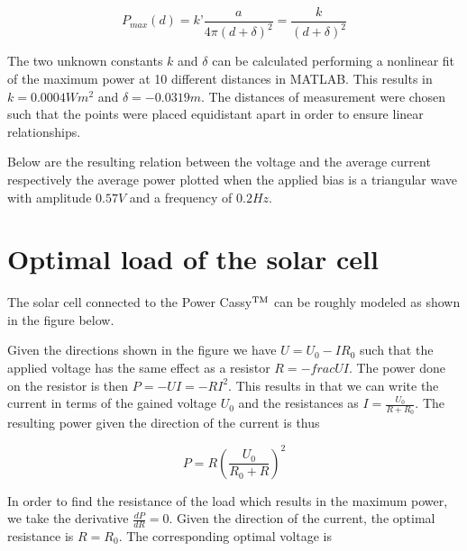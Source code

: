 \documentclass[a4paper,twoside=false,abstract=false,numbers=noenddot,
titlepage=false,headings=small,parskip=half,version=last]{scrartcl}
\begin{document}
\begin{equation}
    P_{max}(d) = k’\frac{a}{4\pi(d+\delta)^2} = \frac{k}{(d+\delta)^2}
\end{equation}

The two unknown constants $k$ and $\delta$ can be calculated performing a nonlinear fit of the maximum power at 10 different distances in MATLAB. This results in $k = 0.0004 Wm^{2}$ and $\delta = -0.0319 m$. The distances of measurement were chosen such that the points were placed equidistant apart in order to ensure linear relationships.


Below are the resulting relation between the voltage and the average current respectively the average power plotted when the applied bias is a triangular wave with amplitude $0.57 V$ and a frequency of $0.2 Hz$.




\section{Optimal load of the solar cell}
The solar cell connected to the Power Cassy$\textsuperscript{TM}$ can be roughly modeled as shown in the figure below.


Given the directions shown in the figure we have $U=U_0-IR_0$ such that the applied voltage has the same effect as a resistor $R=-frac{U}{I}$. The power done on the resistor is then $P=-U I=-R I^{2}$. This results in that we can write the current in terms of the gained voltage $U_0$ and the resistances as $I=\frac{U_0}{R + R_0}$. The resulting power given the direction of the current is thus

\begin{equation}
    P = R (\frac{ U_0}{ R_0+R})^{2}
\end{equation}

In order to find the resistance of the load which results in the maximum power, we take the derivative $\frac{d P}{d R} = 0$. Given the direction of the current, the optimal resistance is $R = R_0$. The corresponding optimal voltage is
\end{document}
